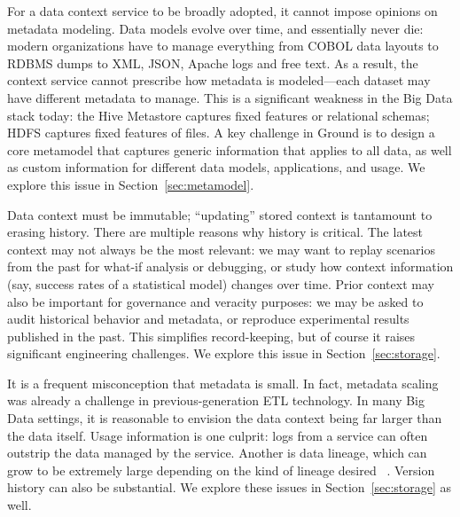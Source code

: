\documentclass{sig-alternate}
\begin{document}
 For a data context service to be broadly adopted, it cannot impose opinions on metadata modeling. 
Data models evolve over time, and essentially never die: modern organizations have to manage everything from COBOL data layouts to RDBMS dumps to XML, JSON, Apache logs and free text. 
As a result, the context service cannot prescribe how metadata is modeled---each dataset may have different metadata to manage. 
This is a significant weakness in the Big Data stack today: the Hive Metastore captures fixed features or relational schemas; HDFS captures fixed features of files.  
A key challenge in Ground is to design a core metamodel that captures generic information that applies to all data, as well as custom information for different data models, applications, and usage. 
We explore this issue in Section~\ref{sec:metamodel}.

 Data context must be immutable; ``updating'' stored context is tantamount to erasing history. %
There are multiple reasons why history is critical. 
The latest context may not always be the most relevant: we may want to replay scenarios from the past for what-if analysis or debugging, or study how context information (say, success rates of a statistical model) changes over time. 
Prior context may also be important for governance and veracity purposes: we may be asked to audit historical behavior and metadata, or reproduce experimental results published in the past. 
This simplifies record-keeping, but of course it raises significant engineering challenges.  
We explore this issue in Section~\ref{sec:storage}.

 It is a frequent misconception that metadata is small. In fact, metadata scaling was already a challenge in previous-generation ETL technology. In many Big Data settings, it is reasonable to envision the data context being far larger than the data itself. Usage information is one culprit:  logs from a service can often outstrip the data managed by the service. Another is data lineage, which can grow to be extremely large
depending on the kind of lineage desired
~\cite{cheney2009provenance}.  Version history can also be substantial. 
We explore these issues in Section~\ref{sec:storage} as well.
\end{document}
